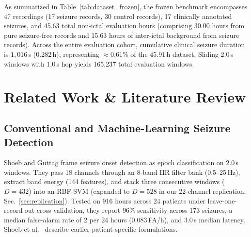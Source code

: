 \documentclass[10pt,twocolumn,letterpaper]{article}
\begin{document}
\begin{table}[t]
\centering
\footnotesize
\caption{Frozen experimental dataset subset across 47 CHB-MIT recordings.}
\label{tab:dataset_frozen}
\end{table}

As summarized in Table~\ref{tab:dataset_frozen}, the frozen benchmark encompasses 47 recordings (17 seizure records, 30 control records), 17 clinically annotated seizures, and 45.63 total non-ictal evaluation hours (comprising 30.00 hours from pure seizure-free records and 15.63 hours of inter-ictal background from seizure records). Across the entire evaluation cohort, cumulative clinical seizure duration is $1{,}016$\,s ($0.282$\,h), representing $\approx 0.61\%$ of the $45.91$\,h dataset. Sliding 2.0\,s windows with 1.0\,s hop yields 165,237 total evaluation windows.

\section{Related Work \& Literature Review}
\label{sec:lit}

\subsection{Conventional and Machine-Learning Seizure Detection}

Shoeb and Guttag \cite{shoeb2010icml} frame seizure onset detection as epoch classification on 2.0\,s windows. They pass 18 channels through an 8-band IIR filter bank (0.5--25\,Hz), extract band energy (144 features), and stack three consecutive windows ($D=432$) into an RBF-SVM (expanded to $D=528$ in our 22-channel replication, Sec.~\ref{sec:replication}). Tested on 916 hours across 24 patients under leave-one-record-out cross-validation, they report 96\% sensitivity across 173 seizures, a median false-alarm rate of 2 per 24 hours (0.083\,FA/h), and 3.0\,s median latency. Shoeb et al.\ \cite{shoeb2004patient} describe earlier patient-specific formulations.
\end{document}
